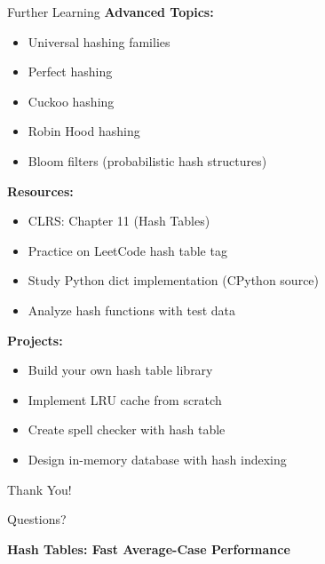 \documentclass[aspectratio=169]{beamer}
\begin{document}
\begin{frame}{Further Learning}
  \textbf{Advanced Topics:}
  \begin{itemize}
    \item Universal hashing families
    \item Perfect hashing
    \item Cuckoo hashing
    \item Robin Hood hashing
    \item Bloom filters (probabilistic hash structures)
  \end{itemize}

  \vspace{0.3cm}
  \textbf{Resources:}
  \begin{itemize}
    \item CLRS: Chapter 11 (Hash Tables)
    \item Practice on LeetCode hash table tag
    \item Study Python dict implementation (CPython source)
    \item Analyze hash functions with test data
  \end{itemize}

  \vspace{0.3cm}
  \textbf{Projects:}
  \begin{itemize}
    \item Build your own hash table library
    \item Implement LRU cache from scratch
    \item Create spell checker with hash table
    \item Design in-memory database with hash indexing
  \end{itemize}
\end{frame}

\begin{frame}
  \begin{center}
    {\Huge Thank You!}

    \vspace{1cm}
    {\Large Questions?}

    \vspace{1cm}
    \textbf{Hash Tables: Fast Average-Case Performance}
  \end{center}
\end{frame}
\end{document}
